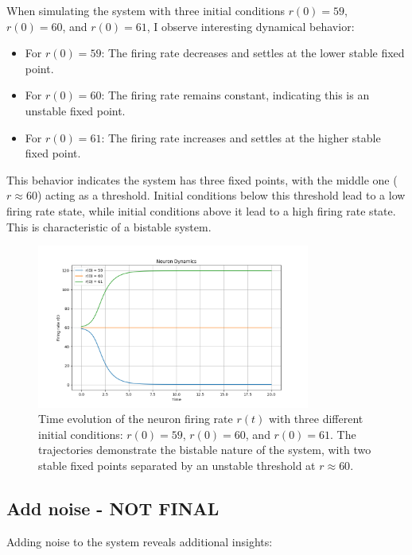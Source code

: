 \documentclass{article}
\begin{document}
When simulating the system with three initial conditions $r(0) = 59$, $r(0) = 60$, and $r(0) = 61$, I observe interesting dynamical behavior:

\begin{itemize}
    \item For $r(0) = 59$: The firing rate decreases and settles at the lower stable fixed point.
    \item For $r(0) = 60$: The firing rate remains constant, indicating this is an unstable fixed point.
    \item For $r(0) = 61$: The firing rate increases and settles at the higher stable fixed point.
\end{itemize}

This behavior indicates the system has three fixed points, with the middle one ($r \approx 60$) acting as a threshold. Initial conditions below this threshold lead to a low firing rate state, while initial conditions above it lead to a high firing rate state. This is characteristic of a bistable system.

\begin{figure}[H]
    \centering
    \includegraphics[width=0.8\textwidth]{deterministic_dynamics.png}
    \caption{Time evolution of the neuron firing rate $r(t)$ with three different initial conditions: $r(0) = 59$, $r(0) = 60$, and $r(0) = 61$. The trajectories demonstrate the bistable nature of the system, with two stable fixed points separated by an unstable threshold at $r \approx 60$.}
    \label{fig:deterministic}
\end{figure}

\subsection{Add noise - NOT FINAL}

Adding noise to the system reveals additional insights:
\end{document}
